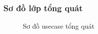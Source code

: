 
\subsubsection{Sơ đồ lớp tổng quát}
\begin{figure}[H]
  \centering
  
  \caption{Sơ đồ usecase tổng quát}
\end{figure}